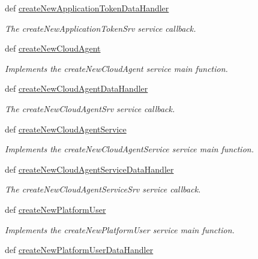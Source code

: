 \begin{DoxyCompactItemize}
def \hyperlink{classmysql__wrapper_1_1MySQLdbWrapper_a2083f7ac355490c98e6249009fda86eb}{create\-New\-Application\-Token\-Data\-Handler}
\begin{DoxyCompactList}\small\item\em The create\-New\-Application\-Token\-Srv service callback. \end{DoxyCompactList}\item 
def \hyperlink{classmysql__wrapper_1_1MySQLdbWrapper_aa2e6c06c6b5b7b31977f5c554ca17b11}{create\-New\-Cloud\-Agent}
\begin{DoxyCompactList}\small\item\em Implements the create\-New\-Cloud\-Agent service main function. \end{DoxyCompactList}\item 
def \hyperlink{classmysql__wrapper_1_1MySQLdbWrapper_a82bbdc528cb64dd5a49472edc00f10d8}{create\-New\-Cloud\-Agent\-Data\-Handler}
\begin{DoxyCompactList}\small\item\em The create\-New\-Cloud\-Agent\-Srv service callback. \end{DoxyCompactList}\item 
def \hyperlink{classmysql__wrapper_1_1MySQLdbWrapper_a07a713d220a00edffbaca1c352c2a59a}{create\-New\-Cloud\-Agent\-Service}
\begin{DoxyCompactList}\small\item\em Implements the create\-New\-Cloud\-Agent\-Service service main function. \end{DoxyCompactList}\item 
def \hyperlink{classmysql__wrapper_1_1MySQLdbWrapper_a78d15be88629da3cd472ea8275423f32}{create\-New\-Cloud\-Agent\-Service\-Data\-Handler}
\begin{DoxyCompactList}\small\item\em The create\-New\-Cloud\-Agent\-Service\-Srv service callback. \end{DoxyCompactList}\item 
def \hyperlink{classmysql__wrapper_1_1MySQLdbWrapper_a024e33e958c2332bddf426bdefc993b3}{create\-New\-Platform\-User}
\begin{DoxyCompactList}\small\item\em Implements the create\-New\-Platform\-User service main function. \end{DoxyCompactList}\item 
def \hyperlink{classmysql__wrapper_1_1MySQLdbWrapper_a7494d1ac0e5d6cea985c0df611e20c21}{create\-New\-Platform\-User\-Data\-Handler}

\end{DoxyCompactItemize}
